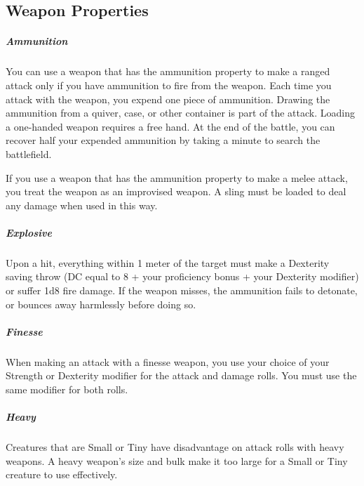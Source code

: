 

\subsection*{Weapon Properties} \label{ssec::weaponproperties}
    \subparagraph{Ammunition}
        You can use a weapon that has the ammunition property to make a ranged attack only if you have ammunition to fire from the weapon.
        Each time you attack with the weapon, you expend one piece of ammunition.
        Drawing the ammunition from a quiver, case, or other container is part of the attack.
        Loading a one-handed weapon requires a free hand.
        At the end of the battle, you can recover half your expended ammunition by taking a minute to search the battlefield.

        If you use a weapon that has the ammunition property to make a melee attack, you treat the weapon as an improvised weapon.
        A sling must be loaded to deal any damage when used in this way.
    \subparagraph{Explosive}
        Upon a hit, everything within 1 meter of the target must make a Dexterity saving throw (DC equal to 8 + your proficiency bonus + your Dexterity modifier) or suffer 1d8 fire damage.
        If the weapon misses, the ammunition fails to detonate, or bounces away harmlessly before doing so.
    \subparagraph{Finesse}
        When making an attack with a finesse weapon, you use your choice of your Strength or Dexterity modifier for the attack and damage rolls.
        You must use the same modifier for both rolls.
    \subparagraph{Heavy}
        Creatures that are Small or Tiny have disadvantage on attack rolls with heavy weapons.
        A heavy weapon's size and bulk make it too large for a Small or Tiny creature to use effectively.

